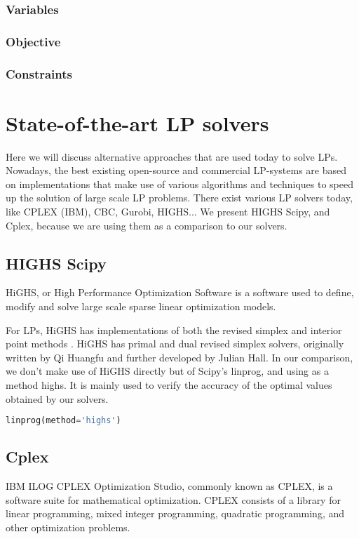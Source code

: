 \subsubsection{Variables}
\subsubsection{Objective}
\subsubsection{Constraints}

\section{State-of-the-art LP solvers}
Here we will discuss alternative approaches that are used today to solve LPs. Nowadays, the best
existing open-source and commercial LP-systems are based on implementations that make use
of various algorithms and techniques to speed up the solution of large scale LP problems.
There exist various LP solvers today, like CPLEX (IBM), CBC, Gurobi, HIGHS... We present HIGHS Scipy, and
Cplex, because we are using them as a comparison to our solvers.
\subsection{HIGHS Scipy}
HiGHS, or High Performance Optimization Software is a software used to define,
modify and solve large scale sparse linear optimization models.

For LPs, HiGHS has implementations of both the revised simplex and interior point methods
\parencite{Huangfu2018}.
HiGHS has primal and
dual revised simplex solvers, originally written by Qi Huangfu and
further developed by Julian Hall.
In our comparison, we don't make use of HiGHS directly but of Scipy's linprog, and using as
a method highs. It is mainly used to verify the accuracy of the optimal values
obtained by our solvers.

\begin{lstlisting}[language=Python]
    linprog(method='highs')
\end{lstlisting}

\subsection{Cplex}
IBM ILOG CPLEX Optimization Studio, commonly known as CPLEX,
is a software suite for mathematical optimization.
CPLEX consists of a library for linear programming,
mixed integer programming, quadratic programming, and other optimization problems.

